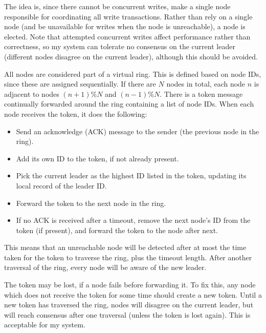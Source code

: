 \documentclass[12pt,a4paper,twoside,openright]{report}
\begin{document}
The idea is, since there cannot be concurrent writes, make a single node responsible for coordinating all write transactions. Rather than rely on a single node (and be unavailable for writes when the node is unreachable), a node is elected. Note that attempted concurrent writes affect performance rather than correctness, so my system can tolerate no consensus on the current leader (different nodes disagree on the current leader), although this should be avoided.

All nodes are considered part of a virtual ring. This is defined based on node IDs, since these are assigned sequentially. If there are $N$ nodes in total, each node $n$ is adjacent to nodes $(n + 1) \% N$ and $(n - 1) \% N$. There is a token message continually forwarded around the ring containing a list of node IDs. When each node receives the token, it does the following:

\begin{itemize}
\item
Send an acknowledge (ACK) message to the sender (the previous node in the ring).

\item
Add its own ID to the token, if not already present.

\item
Pick the current leader as the highest ID listed in the token, updating its local record of the leader ID.

\item
Forward the token to the next node in the ring.

\item
If no ACK is received after a timeout, remove the next node's ID from the token (if present), and forward the token to the node after next.

\end{itemize}


This means that an unreachable node will be detected after at most the time taken for the token to traverse the ring, plus the timeout length. After another traversal of the ring, every node will be aware of the new leader.

The token may be lost, if a node fails before forwarding it. To fix this, any node which does not receive the token for some time should create a new token. Until a new token has traversed the ring, nodes will disagree on the current leader, but will reach consensus after one traversal (unless the token is lost again). This is acceptable for my system.
\end{document}
